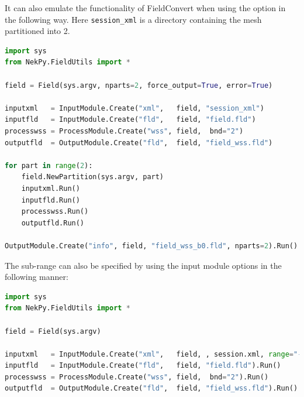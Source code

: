 It can also emulate the functionality of FieldConvert when using the
 option in the following way. Here \verb+session_xml+ is a
directory containing the mesh partitioned into 2.

\begin{lstlisting}[style=C++Style, language=Python]
import sys
from NekPy.FieldUtils import *

field = Field(sys.argv, nparts=2, force_output=True, error=True)

inputxml   = InputModule.Create("xml",   field, "session_xml")
inputfld   = InputModule.Create("fld",   field, "field.fld")
processwss = ProcessModule.Create("wss", field,  bnd="2")
outputfld  = OutputModule.Create("fld",  field, "field_wss.fld")

for part in range(2):
	field.NewPartition(sys.argv, part)
	inputxml.Run()
	inputfld.Run()
	processwss.Run()
	outputfld.Run()

OutputModule.Create("info", field, "field_wss_b0.fld", nparts=2).Run()
\end{lstlisting}

The sub-range can also be specified by using the  input module options  in the following manner: 

\begin{lstlisting}[style=C++Style, language=Python]
import sys
from NekPy.FieldUtils import *

field = Field(sys.argv)

inputxml   = InputModule.Create("xml",   field, , session.xml, range="-1,1,-1,1").Run()
inputfld   = InputModule.Create("fld",   field, "field.fld").Run()
processwss = ProcessModule.Create("wss", field,  bnd="2").Run()
outputfld  = OutputModule.Create("fld",  field, "field_wss.fld").Run()
\end{lstlisting}

